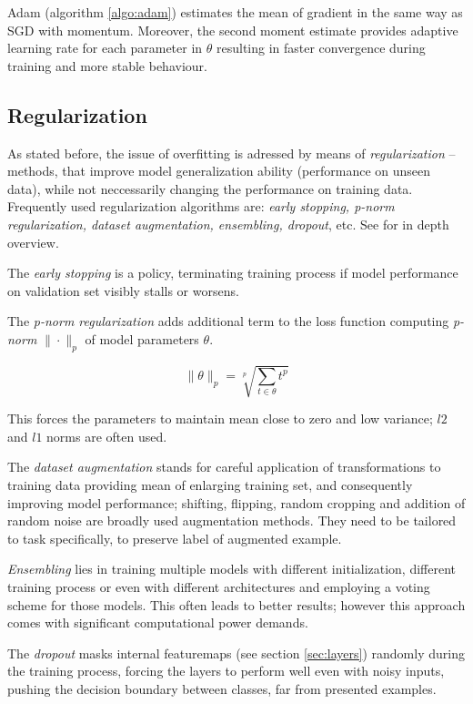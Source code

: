Adam (algorithm \ref{algo:adam}) estimates the mean of gradient in the same way as SGD with momentum. Moreover, the second moment estimate provides adaptive learning rate for each parameter in $\theta$ resulting in faster convergence during training and more stable behaviour.

\subsection{Regularization}
\label{sec:regularization}

As stated before, the issue of overfitting is adressed by means of \emph{regularization} -- methods, that improve model generalization ability (performance on unseen data), while not neccessarily changing the performance on training data. Frequently used regularization algorithms are: \emph{early stopping, p-norm regularization, dataset augmentation, ensembling, dropout}, etc. See \cite{Goodfellow-et-al-2016} for in depth overview.

The \emph{early stopping} is a policy, terminating training process if model performance on validation set visibly stalls or worsens. 

The \emph{p-norm regularization} adds additional term to the loss function computing \emph{p-norm} $\|\cdot\|_p$ of model parameters $\theta$.

\begin{equation} \label{eqn:pnorm}
\|\theta\|_p = \sqrt[p]{\sum_{t \in \theta} t^p}
\end{equation}

This forces the parameters to maintain mean close to zero and low variance; $l2$ and $l1$ norms are often used.

The \emph{dataset augmentation} stands for careful application of transformations to training data providing mean of enlarging training set, and consequently improving model performance; shifting, flipping, random cropping and addition of random noise are broadly used augmentation methods. They need to be tailored to task specifically, to preserve label of augmented example. 

\emph{Ensembling} lies in training multiple models with different initialization, different training process or even with different architectures and employing a voting scheme for those models. This often leads to better results; however this approach comes with significant computational power demands.

The \emph{dropout} masks internal featuremaps (see section \ref{sec:layers}) randomly during the training process, forcing the layers to perform well even with noisy inputs, pushing the decision boundary between classes, far from presented examples.


